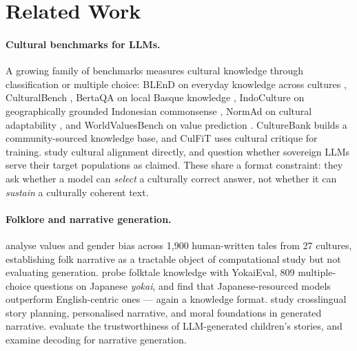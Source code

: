 \documentclass[11pt]{article}
\begin{document}
\section{Related Work}

\paragraph{Cultural benchmarks for LLMs.}
A growing family of benchmarks measures cultural knowledge through
classification or multiple choice: BLEnD on everyday knowledge across cultures
\cite{Myung2024}, CulturalBench \cite{chiu-etal-2025-culturalbench}, BertaQA on
local Basque knowledge \cite{Etxaniz2024}, IndoCulture on geographically
grounded Indonesian commonsense \cite{koto-etal-2024-indoculture}, NormAd on
cultural adaptability \cite{rao-etal-2025-normad}, and WorldValuesBench on
value prediction \cite{zhao-etal-2024-worldvaluesbench}. CultureBank
\cite{shi-etal-2024-culturebank} builds a community-sourced knowledge base, and
CulFiT \cite{feng-etal-2025-culfit} uses cultural critique for training.
\citet{alkhamissi-etal-2024-investigating} study cultural alignment directly,
and \citet{chae-etal-2025-assessing} question whether sovereign LLMs serve
their target populations as claimed. These share a format constraint: they ask
whether a model can \emph{select} a culturally correct answer, not whether it
can \emph{sustain} a culturally coherent text.

\paragraph{Folklore and narrative generation.}
\citet{wu-etal-2023-cross} analyse values and gender bias across 1{,}900
human-written tales from 27 cultures, establishing folk narrative as a
tractable object of computational study but not evaluating generation.
\citet{tsutsumi-jinnai-2025-large} probe folktale knowledge with YokaiEval, 809
multiple-choice questions on Japanese \textit{yokai}, and find that
Japanese-resourced models outperform English-centric ones --- again a knowledge
format. \citet{razumovskaia-etal-2024-little} study crosslingual story
planning, \citet{yunusov-etal-2024-mirrorstories} personalised narrative, and
\citet{mitran-etal-2025-probing} moral foundations in generated narrative.
\citet{bhandari-brennan-2023-trustworthiness} evaluate the trustworthiness of
LLM-generated children's stories, and \citet{delucia-etal-2021-decoding}
examine decoding for narrative generation.
\end{document}
